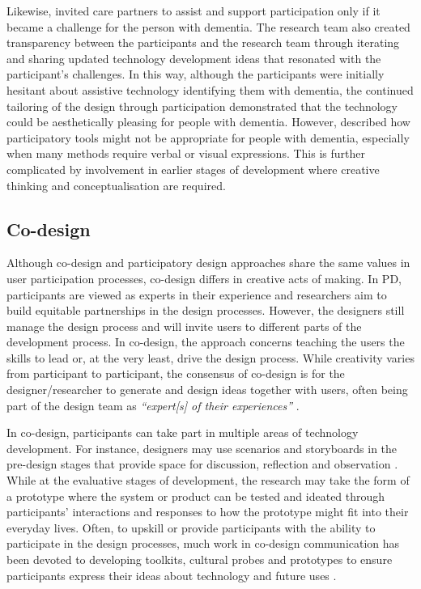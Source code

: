 Likewise, \cite{lindsay_empathy_2012} invited care partners to assist and support participation only if it became a challenge for the person with dementia. The research team also created transparency between the participants and the research team through iterating and sharing updated technology development ideas that resonated with the participant's challenges. In this way, although the participants were initially hesitant about assistive technology identifying them with dementia, the continued tailoring of the design through participation demonstrated that the technology could be aesthetically pleasing for people with dementia. However, \cite{hendriks_challenges_2014} described how participatory tools might not be appropriate for people with dementia, especially when many methods require verbal or visual expressions. This is further complicated by involvement in earlier stages of development where creative thinking and conceptualisation are required.


\subsection{Co-design}
\label{co-design}
Although co-design and participatory design approaches share the same values in user participation processes, co-design differs in creative acts of making. In PD, participants are viewed as experts in their experience and researchers aim to build equitable partnerships in the design processes. However, the designers still manage the design process and will invite users to different parts of the development process. In co-design, the approach concerns teaching the users the skills to lead or, at the very least, drive the design process. While creativity varies from participant to participant, the consensus of co-design is for the designer/researcher to generate and design ideas together with users, often being part of the design team as \textit{``expert[s] of their experiences''} \citep{visser2005contextmapping}.   

In co-design, participants can take part in multiple areas of technology development. For instance, designers may use scenarios and storyboards in the pre-design stages that provide space for discussion, reflection and observation \citep{bell2019collaborative}. While at the evaluative stages of development, the research may take the form of a prototype where the system or product can be tested and ideated through participants' interactions and responses to how the prototype might fit into their everyday lives. Often, to upskill or provide participants with the ability to participate in the design processes, much work in co-design communication has been devoted to developing toolkits, cultural probes and prototypes to ensure participants express their ideas about technology and future uses \citep{medina_angarita_what_2020}.

